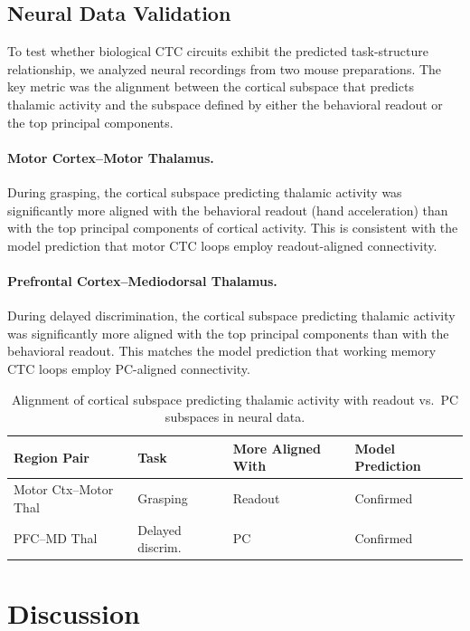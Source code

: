 \documentclass[11pt]{article}
\begin{document}
\subsection{Neural Data Validation}

To test whether biological CTC circuits exhibit the predicted task-structure relationship, we analyzed neural recordings from two mouse preparations. The key metric was the alignment between the cortical subspace that predicts thalamic activity and the subspace defined by either the behavioral readout or the top principal components.

\paragraph{Motor Cortex--Motor Thalamus.} During grasping, the cortical subspace predicting thalamic activity was significantly more aligned with the behavioral readout (hand acceleration) than with the top principal components of cortical activity. This is consistent with the model prediction that motor CTC loops employ readout-aligned connectivity.

\paragraph{Prefrontal Cortex--Mediodorsal Thalamus.} During delayed discrimination, the cortical subspace predicting thalamic activity was significantly more aligned with the top principal components than with the behavioral readout. This matches the model prediction that working memory CTC loops employ PC-aligned connectivity.

\begin{table}[htbp]
\centering
\caption{Alignment of cortical subspace predicting thalamic activity with readout vs.\ PC subspaces in neural data.}
\label{tab:neural_data}
\begin{tabular}{llll}
\toprule
\textbf{Region Pair} & \textbf{Task} & \textbf{More Aligned With} & \textbf{Model Prediction} \\
\midrule
Motor Ctx--Motor Thal & Grasping & Readout & Confirmed \\
PFC--MD Thal & Delayed discrim. & PC & Confirmed \\
\bottomrule
\end{tabular}
\end{table}

\section{Discussion}
\end{document}
